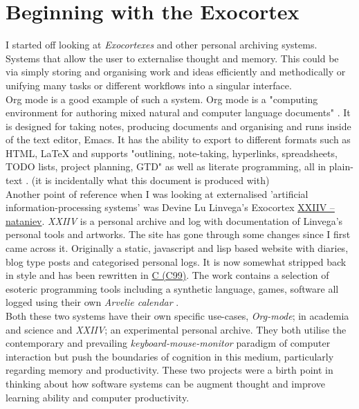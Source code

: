 \documentclass[12pt]{report}
\begin{document}
\section{Beginning with the Exocortex}
\label{sec:orga4c59bb}

I started off looking at \emph{Exocortexes} and other personal archiving systems.
Systems that allow the user to externalise thought and memory. This could be via
simply storing and organising work and ideas efficiently and methodically or
unifying many tasks or different workflows into a singular interface. \\

Org mode is a good example of such a system. Org mode is a "computing
environment for authoring mixed natural and computer language documents"
\cite{Schulte:Davison:Dye:Dominik:2011:JSSOBK:v46i03}. It is designed for taking
notes, producing documents and organising and runs inside of the text editor,
Emacs. It has the ability to export to different formats such as HTML, \LaTeX{} and
supports "outlining, note-taking, hyperlinks, spreadsheets, TODO lists, project
planning, GTD" as well as literate programming, all in plain-text
\cite{Schulte:Davison:Dye:Dominik:2011:JSSOBK:v46i03}. (it is incidentally what
this document is produced with) \\


Another point of reference when I was looking at externalised 'artificial
information-processing systems' was Devine Lu Linvega's Exocortex \href{https://wiki.xxiivv.com/site/nataniev.html}{XXIIV --
nataniev}. \emph{XXIIV} is a personal archive and log with documentation of Linvega's
personal tools and artworks. The site has gone through some changes since I
first came across it. Originally a static, javascript and lisp based website
with diaries, blog type posts and categorised personal logs. It is now somewhat
stripped back in style and has been rewritten in \href{https://en.wikipedia.org/wiki/C99}{C (C99)}. The work contains a
selection of esoteric programming tools including a synthetic language, games,
software all logged using their own \emph{Arvelie calendar} \cite{DevineNataniev}. \\

Both these two systems have their own specific use-cases, \emph{Org-mode}; in
academia and science and \emph{XXIIV}; an experimental personal archive. They both
utilise the contemporary and prevailing \emph{keyboard-mouse-monitor} paradigm
of computer interaction but push the boundaries of cognition in this medium,
particularly regarding memory and productivity. These two projects were a birth
point in thinking about how software systems can be augment thought and improve
learning ability and computer productivity.
\end{document}
